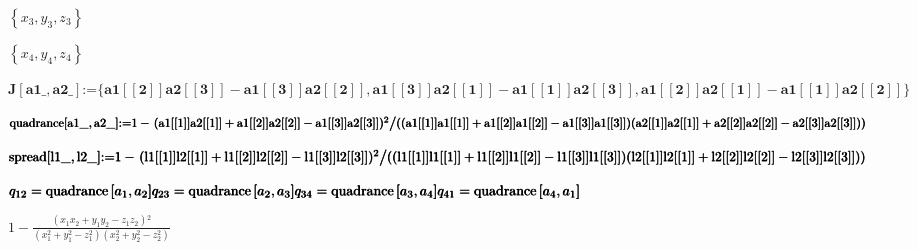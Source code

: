 \documentclass{article}
\begin{document}
\begin{doublespace}
\noindent\(\left\{x_3,y_3,z_3\right\}\)
\end{doublespace}

\begin{doublespace}
\noindent\(\left\{x_4,y_4,z_4\right\}\)
\end{doublespace}

\begin{doublespace}
\noindent\(\pmb{J[\text{a1$\_$},\text{a2$\_$}]\text{:=} \{\text{a1}[[2]]\text{a2}[[3]] - \text{a1}[[3]]\text{a2}[[2]], \text{a1}[[3]]\text{a2}[[1]]-\text{a1}[[1]]\text{a2}[[3]],
\text{a1}[[2]]\text{a2}[[1]]-\text{a1}[[1]]\text{a2}[[2]]\}}\)
\end{doublespace}

\begin{doublespace}
\noindent\(\pmb{\text{quadrance}[\text{a1$\_$},\text{a2$\_$}]\text{:=} }\\
\pmb{1 - \left.(\text{a1}[[1]]\text{a2}[[1]]+\text{a1}[[2]]\text{a2}[[2]]-\text{a1}[[3]]\text{a2}[[3]])^2\right/}\\
\pmb{((\text{a1}[[1]]\text{a1}[[1]]+\text{a1}[[2]]\text{a1}[[2]]-\text{a1}[[3]]\text{a1}[[3]])(\text{a2}[[1]]\text{a2}[[1]]+\text{a2}[[2]]\text{a2}[[2]]-\text{a2}[[3]]\text{a2}[[3]]))}\)
\end{doublespace}

\begin{doublespace}
\noindent\(\pmb{\text{spread}[\text{l1$\_$},\text{l2$\_$}]\text{:=} }\\
\pmb{1 - \left.(\text{l1}[[1]]\text{l2}[[1]]+\text{l1}[[2]]\text{l2}[[2]]-\text{l1}[[3]]\text{l2}[[3]])^2\right/}\\
\pmb{((\text{l1}[[1]]\text{l1}[[1]]+\text{l1}[[2]]\text{l1}[[2]]-\text{l1}[[3]]\text{l1}[[3]])(\text{l2}[[1]]\text{l2}[[1]]+\text{l2}[[2]]\text{l2}[[2]]-\text{l2}[[3]]\text{l2}[[3]]))}\)
\end{doublespace}

\begin{doublespace}
\noindent\(\pmb{q_{12}=\text{quadrance}\left[a_1,a_2\right]}\\
\pmb{q_{23}=\text{quadrance}\left[a_2,a_3\right]}\\
\pmb{q_{34}=\text{quadrance}\left[a_3,a_4\right]}\\
\pmb{q_{41}=\text{quadrance}\left[a_4,a_1\right]}\)
\end{doublespace}

\begin{doublespace}
\noindent\(1-\frac{\left(x_1 x_2+y_1 y_2-z_1 z_2\right){}^2}{\left(x_1^2+y_1^2-z_1^2\right) \left(x_2^2+y_2^2-z_2^2\right)}\)
\end{doublespace}
\end{document}
